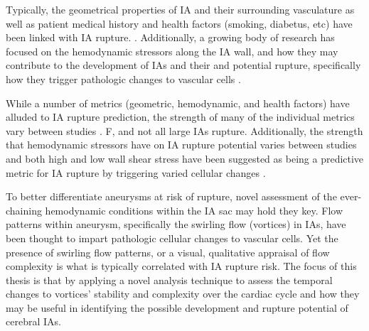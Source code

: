
Typically, the geometrical properties of IA and their surrounding vasculature as well as patient medical history and health factors (smoking, diabetus, etc) \cite{Backes951} have been linked with IA rupture. \cite{Steiner_2018,Thompson2015guidelines}. Additionally, a growing body of research has focused on the hemodynamic stressors along the IA wall, and how they may contribute to the development of IAs and their and potential rupture, specifically how they trigger pathologic changes to vascular cells \cite{baek2009flow,dolan2013high,byrne2014quantifying,cecchi2011role,kulcsar2011hemodynamics}. 

While a number of metrics (geometric, hemodynamic, and health factors) have alluded to IA rupture prediction, the strength of many of the individual metrics vary between studies \cite{zhou2017association}. F, and not all large IAs rupture. Additionally, the strength that hemodynamic stressors have on IA rupture potential varies between studies and both high and low wall shear stress have been suggested as being a predictive metric for IA rupture by triggering varied cellular changes \cite{Meng1254}. 

To better differentiate aneurysms at risk of rupture, novel assessment of the ever-chaining hemodynamic conditions within the IA sac may hold they key. Flow patterns within aneurysm, specifically the swirling flow (vortices) in IAs, have been thought to impart pathologic cellular changes to vascular cells. Yet the presence of swirling flow patterns, or a visual, qualitative appraisal of flow complexity is what is typically correlated with IA rupture risk. The focus of this thesis is that by applying a novel analysis technique to assess the temporal changes to vortices' stability and complexity over the cardiac cycle and how they may be useful in identifying the possible development and rupture potential of cerebral IAs. 



